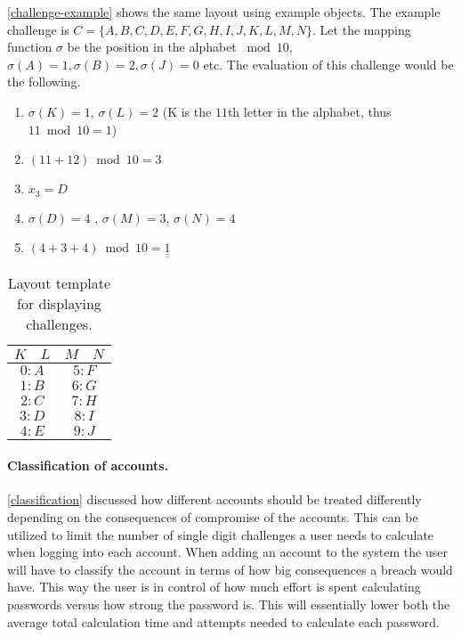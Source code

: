 \begin{example}
    \autoref{challenge-example} shows the same layout using example objects. The example challenge is $C = \{A, B, C, D, E, F, G, H, I, J, K, L, M, N\}$. Let the mapping function $\sigma$ be the position in the alphabet $\bmod 10$, $\sigma(A)=1, \sigma(B)=2, \sigma(J)=0$ etc. The evaluation of this challenge would be the following.
    \begin{enumerate}
        \item $\sigma(K) = 1$, $\sigma(L)=2$ (K is the $11$th letter in the alphabet, thus $11 \bmod 10 = 1$)
        \item $(11 + 12) \bmod 10 = 3$
        \item $x_3 = D$
        \item $\sigma(D) = 4$ , $\sigma(M)=3$, $\sigma(N)=4$
        \item $(4 + 3 + 4) \bmod 10 = \underline{\underline{1}}$

    \end{enumerate}

    
    \begin{table}[h]
        \centering
        \begin{tabular}{|c c|c|c|}
            \hline
            $K$ & $L$ & $M$ & $N$ \\
            \hline \hline
            \multicolumn{2}{|c|}{$0:A$} & \multicolumn{2}{|c|}{$5:F$}\\
            \multicolumn{2}{|c|}{$1:B$} & \multicolumn{2}{|c|}{$6:G$}\\
            \multicolumn{2}{|c|}{$2:C$} & \multicolumn{2}{|c|}{$7:H$}\\
            \multicolumn{2}{|c|}{$3:D$} & \multicolumn{2}{|c|}{$8:I$}\\
            \multicolumn{2}{|c|}{$4:E$} & \multicolumn{2}{|c|}{$9:J$}\\
            \hline 
        \end{tabular}
        \caption{Layout template for displaying challenges.}
        \label{challenge-example}
    \end{table}


\end{example}

\paragraph{Classification of accounts.}
\autoref{classification} discussed how different accounts should be treated differently depending on the consequences of compromise of the accounts. This can be utilized to limit the number of single digit challenges a user needs to calculate when logging into each account. When adding an account to the system the user will have to classify the account in terms of how big consequences a breach would have. This way the user is in control of how much effort is spent calculating passwords versus how strong the password is. This will essentially lower both the average total calculation time and attempts needed to calculate each password. 

